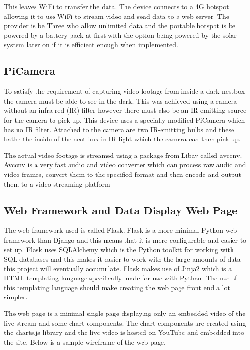 \documentclass[10pt,a4paper]{article}
\begin{document}
This leaves WiFi to transfer the data. The device connects to a 4G hotspot allowing it to use WiFi to stream video and send data to a web server. The provider is be Three who allow unlimited data and the portable hotspot is be powered by a battery pack at first with the option being powered by the solar system later on if it is efficient enough when implemented. 

\subsection{PiCamera}
To satisfy the requirement of capturing video footage from inside a dark nestbox the camera must be able to see in the dark. This was achieved using a camera without an infra-red (IR) filter however there must also be an IR-emitting source for the camera to pick up. This device uses a specially modified PiCamera which has no IR filter. Attached to the camera are two IR-emitting bulbs and these bathe the inside of the nest box in IR light which the camera can then pick up. 

The actual video footage is streamed using a package from Libav called avconv. Avconv is a very fast audio and video converter which can process raw audio and video frames, convert them to the specified format and then encode and output them to a video streaming platform\cite{avconv}

\subsection{Web Framework and Data Display Web Page}
The web framework used is called Flask. Flask is a more minimal Python web framework than Django and this means that it is more configurable and easier to set up. Flask uses SQLAlchemy which is the Python toolkit for working with SQL databases and this makes it easier to work with the large amounts of data this project will eventually accumulate. Flask makes use of Jinja2 which is a HTML templating language specifically made for use with Python. The use of this templating language should make creating the web page front end a lot simpler.

The web page is a minimal single page displaying only an embedded video of the live stream and some chart components. The chart components are created using the charts.js library and the live video is hosted on YouTube and embedded into the site. Below is a sample wireframe of the web page. 
\end{document}
